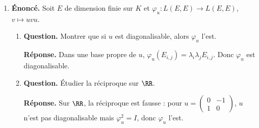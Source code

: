 \documentclass[12pt, a4paper]{article}
\begin{document}
\begin{enumerate}[label=9.\arabic*., start=94]
\begin{minipage}[t]{\linewidth}
\begin{enumerate}[\arabic*.]
  \item \textbf{Question.} Montrer que $A$ est diagonalisable si et seulement si $A^\top$ l’est.
\par\smallskip
\textbf{Réponse.} Si $A=PDP^{-1}$, $A^\top=(P^{-1})^\top DP^\top$ est diagonalisable ; la réciproque suit en transposant à nouveau.

  \item \textbf{Question.} Montrer que si $A$ est diagonalisable, alors $L_A$ l’est.
\par\smallskip
\textbf{Réponse.} Dans une base où $A=\operatorname{diag}(\lambda_i)$, $L_A(E_{i,j})=(\lambda_i-\lambda_j)E_{i,j}$.
        Les matrices élémentaires donnent une base propre de $L_A$.

  \item \textbf{Question.} Étudier la réciproque, à l’aide de la décomposition de Dunford.
\par\smallskip
\textbf{Réponse.} Écrire $A=S+N$ selon Dunford.
        Alors $L_A=L_S+L_N$, avec $L_S$ diagonalisable, $L_N$ nilpotent, et les deux commutent.
        Si $L_A$ est diagonalisable, l'unicité de Dunford impose $L_N=0$.
        Donc $N$ commute avec toutes les matrices, et est scalaire.
        Comme elle est nilpotente, $N=0$.
        $\therefore A$ est diagonalisable : la réciproque est vraie.

\end{enumerate}
\end{minipage}

  \item \begin{minipage}[t]{\linewidth}\raggedright
\textbf{Énoncé.} Soit $E$ de dimension finie sur $K$ et $\varphi_u:L(E,E)\to L(E,E)$, $v\mapsto uvu$.

\begin{enumerate}[\arabic*.]
        \item \textbf{Question.} Montrer que si $u$ est diagonalisable, alors $\varphi_u$ l’est.
\par\smallskip
\textbf{Réponse.} Dans une base propre de $u$, $\varphi_u(E_{i,j})=\lambda_i\lambda_j E_{i,j}$.
        Donc $\varphi_u$ est diagonalisable.

  \item \textbf{Question.} Étudier la réciproque sur $\RR$.
\par\smallskip
\textbf{Réponse.} Sur $\RR$, la réciproque est fausse : pour $u=\begin{pmatrix}0&-1\\1&0\end{pmatrix}$, $u$ n'est pas diagonalisable mais $\varphi_u^2=I$, donc $\varphi_u$ l'est.


\end{enumerate}
\end{minipage}
\end{enumerate}
\end{document}
